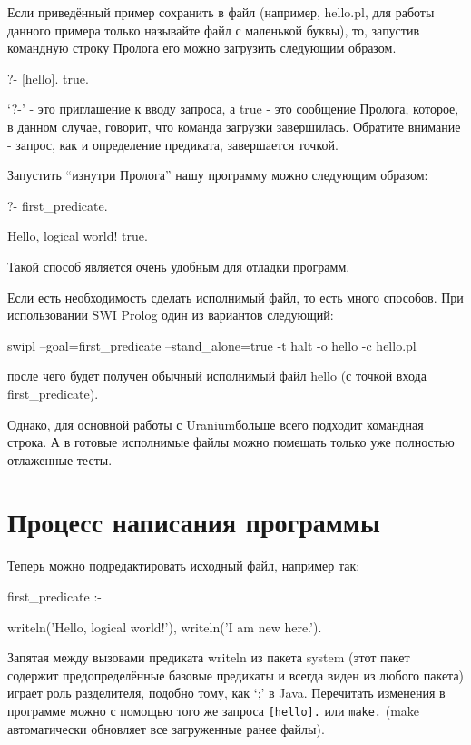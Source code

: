 \documentclass[a4paper]{book}
\def\ur{Uranium}
\begin{document}
Если приведённый пример сохранить в файл (например, hello.pl, для
работы данного примера только называйте файл с маленькой буквы),
то, запустив командную строку Пролога его можно загрузить
следующим образом.

\begin{example}{}{}
?- [hello].
true.
\end{example}

`?-' - это приглашение к вводу запроса, а true - это сообщение
Пролога, которое, в данном случае, говорит, что команда загрузки
завершилась. Обратите внимание - запрос, как и определение
предиката, завершается точкой.

Запустить ``изнутри Пролога'' нашу программу можно следующим
образом:

\begin{example}{}{}
?- first_predicate.

Hello, logical world!
true.
\end{example}

Такой способ является очень удобным для отладки программ.

Если есть необходимость сделать исполнимый файл, то есть много
способов. При использовании SWI Prolog один из вариантов
следующий:

\begin{example}{}{}
swipl --goal=first_predicate --stand_alone=true -t halt -o hello -c hello.pl
\end{example}

после чего будет получен обычный исполнимый файл hello (с точкой
входа first_predicate).

Однако, для основной работы с \ur больше всего подходит командная
строка. А в готовые исполнимые файлы можно помещать только уже
полностью отлаженные тесты.

\section{Процесс написания программы}

Теперь можно подредактировать исходный файл, например так:

\begin{example}{}{}
first_predicate :-

   writeln('Hello, logical world!'),
   writeln('I am new here.').
\end{example}

Запятая между вызовами предиката writeln из пакета system (этот
пакет содержит предопределённые базовые предикаты и всегда виден
из любого пакета) играет роль разделителя, подобно тому, как `;'
в Java. Перечитать изменения в программе можно с помощью того же
запроса \verb|[hello].| или \verb|make.| (make автоматически
обновляет все загруженные ранее файлы).
\end{document}
